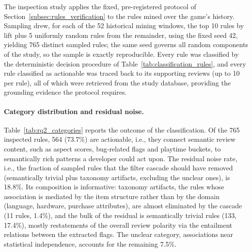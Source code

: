 \noindent The inspection study applies the fixed, pre-registered protocol of Section~\ref{subsec:rules_verification} to the rules mined over the game's history. Sampling drew, for each of the 52 historical mining windows, the top 10 rules by lift plus 5 uniformly random rules from the remainder, using the fixed seed 42, yielding 765 distinct sampled rules; the same seed governs all random components of the study, so the sample is exactly reproducible. Every rule was classified by the deterministic decision procedure of Table~\ref{tab:classification_rules}, and every rule classified as actionable was traced back to its supporting reviews (up to 10 per rule), all of which were retrieved from the study database, providing the grounding evidence the protocol requires.

\paragraph{Category distribution and residual noise.} Table~\ref{tab:rq2_categories} reports the outcome of the classification. Of the 765 inspected rules, 564 (73.7\%) are actionable, i.e., they connect semantic review content, such as aspect scores, bug-related flags and playtime buckets, to semantically rich patterns a developer could act upon. The residual noise rate, i.e., the fraction of sampled rules that the filter cascade should have removed (semantically trivial plus taxonomy artifacts, excluding the unclear ones), is 18.8\%. Its composition is informative: taxonomy artifacts, the rules whose association is mediated by the item structure rather than by the domain (language, hardware, purchase attributes), are almost eliminated by the cascade (11 rules, 1.4\%), and the bulk of the residual is semantically trivial rules (133, 17.4\%), mostly restatements of the overall review polarity via the entailment relations between the extracted flags. The unclear category, associations near statistical independence, accounts for the remaining 7.5\%.

